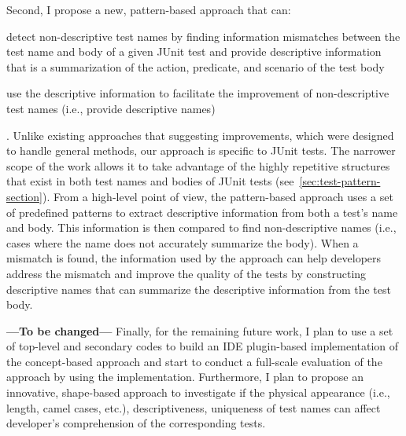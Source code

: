 Second, I propose a new, pattern-based approach that can:
\begin{enumerate*}
\item detect non-descriptive test names by finding information mismatches between the test name and body of a given JUnit test and provide descriptive information that is a summarization of the action, predicate, and scenario of the test body
\item use the descriptive information to facilitate the improvement of non-descriptive test names (i.e., provide descriptive names)
\end{enumerate*}.
%
Unlike existing approaches that suggesting improvements, which were designed to handle general methods, our approach is specific to JUnit tests.
%
The narrower scope of the work allows it to take advantage of the highly repetitive structures that exist in both test names and bodies of JUnit tests (see~\cref{sec:test-pattern-section}).
%
From a high-level point of view, the pattern-based approach uses a set of predefined patterns to extract descriptive information from both a test's name and body.
%
This information is then compared to find non-descriptive names (i.e., cases where the name does not accurately summarize the body).
%
When a mismatch is found, the information used by the approach can help developers address the mismatch and improve the quality of the tests by constructing descriptive names that can summarize the descriptive information from the test body.


\textbf{---To be changed---}
Finally, for the remaining future work, I plan to use a set of top-level and secondary codes to build an IDE plugin-based implementation of the concept-based approach and start to conduct a full-scale evaluation of the approach by using the implementation.
%
Furthermore, I plan to propose an innovative, shape-based approach to investigate if the physical appearance (i.e., length, camel cases, etc.), descriptiveness, uniqueness of test names can affect developer's comprehension of the corresponding tests.
